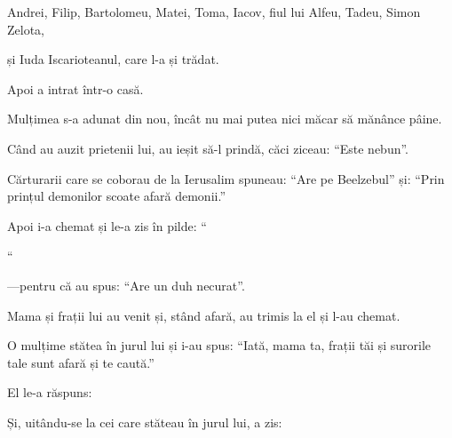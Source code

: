 {Andrei, Filip, Bartolomeu, Matei, Toma, Iacov, fiul lui Alfeu, Tadeu, Simon Zelota,

și Iuda Iscarioteanul, care l-a și trădat.

\par }{\PP Apoi a intrat într-o casă.

Mulțimea s-a adunat din nou, încât nu mai putea nici măcar să mănânce pâine.

Când au auzit prietenii lui, au ieșit să-l prindă, căci ziceau: “Este nebun”.

Cărturarii care se coborau de la Ierusalim spuneau: “Are pe Beelzebul” și: “Prin prințul demonilor scoate afară demonii.”


\par }{\PP {}Apoi i-a chemat și le-a zis în pilde: “{}






\par }{\PP {}“{}


—pentru că au spus: “Are un duh necurat”.


\par }{\PP {}Mama și frații lui au venit și, stând afară, au trimis la el și l-au chemat.

O mulțime stătea în jurul lui și i-au spus: “Iată, mama ta, frații tăi și surorile tale sunt afară și te caută.”


\par }{\PP {}El le-a răspuns:
{}

Și, uitându-se la cei care stăteau în jurul lui, a zis:
{}

}
